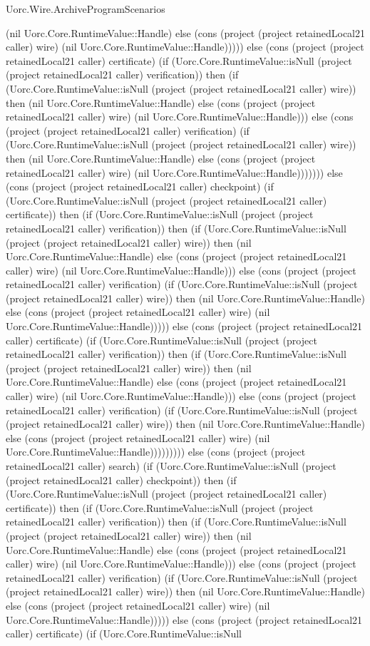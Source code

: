 \begin{lexlean}{Uorc.Wire.ArchiveProgramScenarios}
\begin{semanticmodule}
{(nil Uorc.Core.RuntimeValue::Handle) else (cons (project (project retainedLocal21 caller) wire) (nil Uorc.Core.RuntimeValue::Handle))))) else (cons (project (project retainedLocal21 caller) certificate) (if (Uorc.Core.RuntimeValue::isNull (project (project retainedLocal21 caller) verification)) then (if (Uorc.Core.RuntimeValue::isNull (project (project retainedLocal21 caller) wire)) then (nil Uorc.Core.RuntimeValue::Handle) else (cons (project (project retainedLocal21 caller) wire) (nil Uorc.Core.RuntimeValue::Handle))) else (cons (project (project retainedLocal21 caller) verification) (if (Uorc.Core.RuntimeValue::isNull (project (project retainedLocal21 caller) wire)) then (nil Uorc.Core.RuntimeValue::Handle) else (cons (project (project retainedLocal21 caller) wire) (nil Uorc.Core.RuntimeValue::Handle))))))) else (cons (project (project retainedLocal21 caller) checkpoint) (if (Uorc.Core.RuntimeValue::isNull (project (project retainedLocal21 caller) certificate)) then (if (Uorc.Core.RuntimeValue::isNull (project (project retainedLocal21 caller) verification)) then (if (Uorc.Core.RuntimeValue::isNull (project (project retainedLocal21 caller) wire)) then (nil Uorc.Core.RuntimeValue::Handle) else (cons (project (project retainedLocal21 caller) wire) (nil Uorc.Core.RuntimeValue::Handle))) else (cons (project (project retainedLocal21 caller) verification) (if (Uorc.Core.RuntimeValue::isNull (project (project retainedLocal21 caller) wire)) then (nil Uorc.Core.RuntimeValue::Handle) else (cons (project (project retainedLocal21 caller) wire) (nil Uorc.Core.RuntimeValue::Handle))))) else (cons (project (project retainedLocal21 caller) certificate) (if (Uorc.Core.RuntimeValue::isNull (project (project retainedLocal21 caller) verification)) then (if (Uorc.Core.RuntimeValue::isNull (project (project retainedLocal21 caller) wire)) then (nil Uorc.Core.RuntimeValue::Handle) else (cons (project (project retainedLocal21 caller) wire) (nil Uorc.Core.RuntimeValue::Handle))) else (cons (project (project retainedLocal21 caller) verification) (if (Uorc.Core.RuntimeValue::isNull (project (project retainedLocal21 caller) wire)) then (nil Uorc.Core.RuntimeValue::Handle) else (cons (project (project retainedLocal21 caller) wire) (nil Uorc.Core.RuntimeValue::Handle))))))))) else (cons (project (project retainedLocal21 caller) search) (if (Uorc.Core.RuntimeValue::isNull (project (project retainedLocal21 caller) checkpoint)) then (if (Uorc.Core.RuntimeValue::isNull (project (project retainedLocal21 caller) certificate)) then (if (Uorc.Core.RuntimeValue::isNull (project (project retainedLocal21 caller) verification)) then (if (Uorc.Core.RuntimeValue::isNull (project (project retainedLocal21 caller) wire)) then (nil Uorc.Core.RuntimeValue::Handle) else (cons (project (project retainedLocal21 caller) wire) (nil Uorc.Core.RuntimeValue::Handle))) else (cons (project (project retainedLocal21 caller) verification) (if (Uorc.Core.RuntimeValue::isNull (project (project retainedLocal21 caller) wire)) then (nil Uorc.Core.RuntimeValue::Handle) else (cons (project (project retainedLocal21 caller) wire) (nil Uorc.Core.RuntimeValue::Handle))))) else (cons (project (project retainedLocal21 caller) certificate) (if (Uorc.Core.RuntimeValue::isNull }
\end{semanticmodule}
\end{lexlean}
